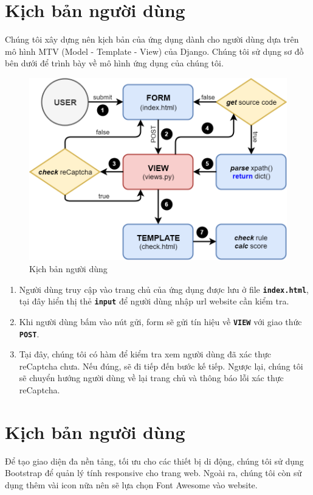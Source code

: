 \section{Kịch bản người dùng}
Chúng tôi xây dựng nên kịch bản của ứng dụng dành cho người dùng dựa trên mô hình MTV (Model - Template - View) của Django. Chúng tôi sử dụng sơ đồ bên dưới để trình bày về mô hình ứng dụng của chúng tôi.
\begin{center}
	\begin{figure}[!ht]
		\centering
		\includegraphics[width=120mm]{images/kich-ban-nguoi-dung.png}
		\caption{Kịch bản người dùng}
	\end{figure}
\end{center}
\begin{enumerate}
	\item Người dùng truy cập vào trang chủ của ứng dụng được lưu ở file \textbf{\texttt{index.html}}, tại đây hiển thị thẻ \textbf{\texttt{input}} để người dùng nhập url website cần kiểm tra.
	\item Khi người dùng bấm vào nút gửi, form sẽ gửi tín hiệu về \textbf{\texttt{VIEW}} với giao thức \textbf{\texttt{POST}}.
	\item Tại đây, chúng tôi có hàm để kiểm tra xem người dùng đã xác thực reCaptcha chưa. Nếu đúng, sẽ đi tiếp đến bước kế tiếp. Ngược lại, chúng tôi sẽ chuyển hướng người dùng về lại trang chủ và thông báo lỗi xác thực reCaptcha.
\end{enumerate}
\section{Kịch bản người dùng}
Để tạo giao diện đa nền tảng, tối ưu cho các thiết bị di động, chúng tôi sử dụng Bootstrap để quản lý tính responsive cho trang web. Ngoài ra, chúng tôi còn sử dụng thêm vài icon nữa nên sẽ lựa chọn Font Awesome vào website.
